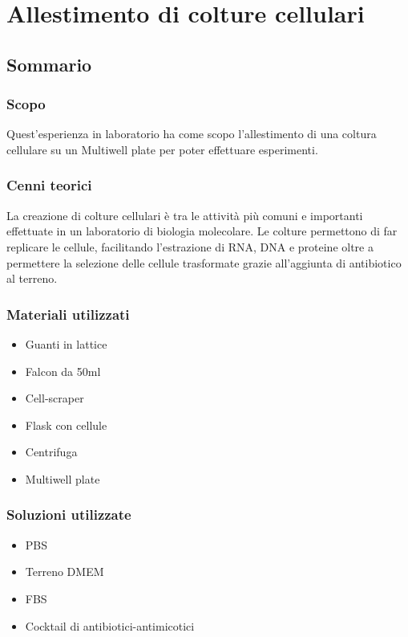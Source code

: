 \section{\LARGE{Allestimento di colture cellulari}}

\vspace{0.6cm}

\subsection{Sommario}

\subsubsection{Scopo}

Quest'esperienza in laboratorio ha come scopo l'allestimento di una coltura cellulare
su un Multiwell plate per poter effettuare esperimenti.

\subsubsection{Cenni teorici}

La creazione di colture cellulari \`e tra le attivit\`a pi\`u comuni e importanti
effettuate in un laboratorio di biologia molecolare. Le colture permettono di
far replicare le cellule, facilitando l'estrazione di RNA, DNA e proteine oltre a
permettere la selezione delle cellule trasformate grazie all'aggiunta di antibiotico
al terreno.

\subsubsection{Materiali utilizzati}

\begin{itemize}
	\item Guanti in lattice
	\item Falcon da 50ml
	\item Cell-scraper
	\item Flask con cellule
	\item Centrifuga
	\item Multiwell plate
\end{itemize}

\subsubsection{Soluzioni utilizzate}

\begin{itemize}
	\item PBS
	\item Terreno DMEM
	\item FBS
	\item Cocktail di antibiotici-antimicotici
\end{itemize}

